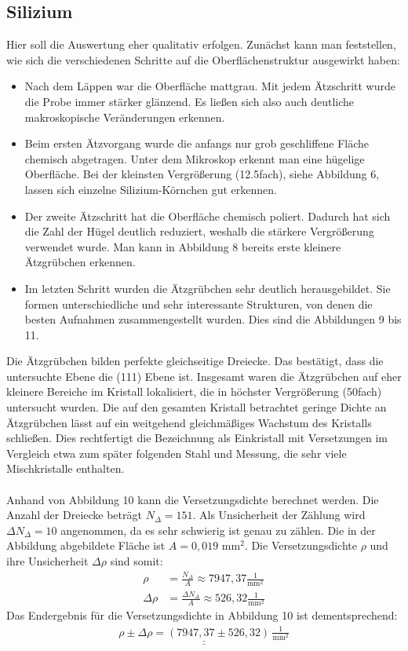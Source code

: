 \documentclass[german,  %
parskip=full,  %
]{scrartcl}
\begin{document}
\subsection{Silizium}
Hier soll die Auswertung eher qualitativ erfolgen. Zunächst kann man feststellen, wie sich die verschiedenen Schritte auf die Oberflächenstruktur ausgewirkt haben:
\begin{itemize}
\item Nach dem Läppen war die Oberfläche mattgrau. Mit jedem Ätzschritt wurde die Probe immer stärker glänzend. Es ließen sich also auch deutliche makroskopische Veränderungen erkennen.
\item Beim ersten Ätzvorgang wurde die anfangs nur grob geschliffene Fläche chemisch abgetragen. Unter dem Mikroskop erkennt man eine hügelige Oberfläche. Bei der kleinsten Vergrößerung (12.5fach), siehe Abbildung 6, lassen sich einzelne Silizium-Körnchen gut erkennen.
\item Der zweite Ätzschritt hat die Oberfläche chemisch poliert. Dadurch hat sich die Zahl der Hügel deutlich reduziert, weshalb die stärkere Vergrößerung verwendet wurde. Man kann in Abbildung 8 bereits erste kleinere Ätzgrübchen erkennen.
\item Im letzten Schritt wurden die Ätzgrübchen sehr deutlich herausgebildet. Sie formen unterschiedliche und sehr interessante Strukturen, von denen die besten Aufnahmen zusammengestellt wurden. Dies sind die Abbildungen 9 bis 11.
\end{itemize}
Die Ätzgrübchen bilden perfekte gleichseitige Dreiecke. Das bestätigt, dass die untersuchte Ebene die (111) Ebene ist. Insgesamt waren die Ätzgrübchen auf eher kleinere Bereiche im Kristall lokalisiert, die in höchster Vergrößerung (50fach) untersucht wurden. Die auf den gesamten Kristall betrachtet geringe Dichte an Ätzgrübchen lässt auf ein weitgehend gleichmäßiges Wachstum des Kristalls schließen. Dies rechtfertigt die Bezeichnung als Einkristall mit Versetzungen im Vergleich etwa zum später folgenden Stahl und Messung, die sehr viele Mischkristalle enthalten.\\\\
Anhand von Abbildung 10 kann die Versetzungsdichte berechnet werden. Die Anzahl der Dreiecke beträgt $N_{\Delta} = 151$. Als Unsicherheit der Zählung wird $\Delta N_{\Delta} = 10$ angenommen, da es sehr schwierig ist genau zu zählen. Die in der Abbildung abgebildete Fläche ist $A = 0,019$ mm$^2$. Die Versetzungsdichte $\rho$ und ihre Unsicherheit $\Delta \rho$ sind somit:
\begin{align}
\rho &= \frac{N_{\Delta}}{A} \approx 7947,37 \frac{1}{\text{mm}^2} \\
\Delta \rho &= \frac{\Delta N_{\Delta}}{A} \approx 526,32 \frac{1}{\text{mm}^2}
\end{align}
Das Endergebnis für die Versetzungsdichte in Abbildung 10 ist dementsprechend:
\begin{align*}
\underline{\underline{\rho \pm \Delta \rho = (7947,37 \pm 526,32) \, \frac{1}{\text{mm}^2}}}
\end{align*}
\end{document}
